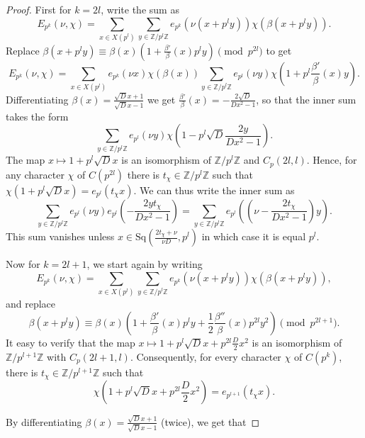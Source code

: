 \documentclass[12pt]{amsart}
\theoremstyle{definition}
\theoremstyle{remark}
\numberwithin{equation}{section}
\newcommand{\bbZ}{\mathbb{Z}}
\newcommand{\Sq}{\mathrm{Sq}}
\begin{document}
\begin{proof}
First for $k=2l$, write the sum as
\[E_{p^k}(\nu,\chi)=\sum_{x\in X(p^l)}\sum_{y\in\bbZ/p^l\bbZ}e_{p^k}(\nu (x+p^ly))\chi(\beta(x+p^ly)).\]
Replace $\beta(x+p^ly)\equiv \beta(x)(1+\frac{\beta'}{\beta}(x)p^l
y) \pmod{p^{2l}}$ to get
\[E_{p^k}(\nu,\chi)=\sum_{x\in X(p^l)}e_{p^k}(\nu x)\chi(\beta(x))\sum_{y\in\bbZ/p^l\bbZ}e_{p^l}(\nu y)\chi(1+p^l\frac{\beta'}{\beta}(x)y).\]
Differentiating $\beta(x)=\frac{\sqrt{D}x+1}{\sqrt{D}x-1}$ we get
$\frac{\beta'}{\beta}(x)=-\frac{2\sqrt{D}}{Dx^2-1}$, so that the
inner sum takes the form
\[\sum_{y\in\bbZ/p^l\bbZ}e_{p^l}(\nu y)\chi(1-p^l\sqrt{D}\frac{2y}{Dx^2-1}).\]
The map $x\mapsto 1+p^l\sqrt{D}x$ is an isomorphism of
$\bbZ/p^l\bbZ$ and $C_p(2l,l)$. Hence, for any character $\chi$ of
$C(p^{2l})$ there is $t_\chi\in\bbZ/p^l\bbZ$ such that
$\chi(1+p^l\sqrt{D}x)=e_{p^l}(t_\chi x)$. We can thus write the
inner sum as
\[\sum_{y\in\bbZ/p^l\bbZ}e_{p^l}(\nu y)e_{p^l}(-\frac{2yt_\chi}{Dx^2-1})=\sum_{y\in\bbZ/p^l\bbZ}e_{p^l}((\nu-\frac{2t_\chi}{Dx^2-1})y).\]
This sum vanishes unless $x\in \Sq(\frac{2t_\chi+\nu}{\nu D},p^l)$
in which case it is equal $p^l$.

 Now for $k=2l+1$, we start again by writing
\[E_{p^k}(\nu,\chi)=\sum_{x\in X(p^l)}\sum_{y\in\bbZ/p^l\bbZ}e_{p^k}(\nu (x+p^ly))\chi(\beta(x+p^ly)),\]
and replace
\[\beta(x+p^ly)\equiv \beta(x)(1+\frac{\beta'}{\beta}(x)p^l y +\frac{1}{2}\frac{\beta''}{\beta}(x)p^{2l}y^2) \pmod{p^{2l+1}}.\]
It easy to verify that the map $x\mapsto
1+p^l\sqrt{D}x+p^{2l}\frac{D}{2}x^2$ is an isomorphism of
$\bbZ/p^{l+1}\bbZ$ with $C_p(2l+1,l)$. Consequently, for every
character $\chi$ of $C(p^k)$, there is $t_\chi\in\bbZ/p^{l+1}\bbZ$
such that
\[\chi(1+p^l\sqrt{D}x+p^{2l}\frac{D}{2}x^2)=e_{p^{l+1}}(t_\chi x).\]

By differentiating $\beta(x)=\frac{\sqrt{D}x+1}{\sqrt{D}x-1}$
(twice), we get that


\end{proof}
\end{document}
